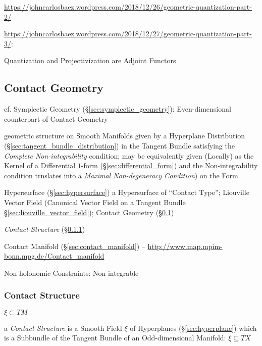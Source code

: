 \url{https://johncarlosbaez.wordpress.com/2018/12/26/geometric-quantization-part-2/}

\url{https://johncarlosbaez.wordpress.com/2018/12/27/geometric-quantization-part-3/}:

Quantization and Projectivization are Adjoint Functors



\subsection{Contact Geometry}\label{sec:contact_geometry}

\fist cf. Symplectic Geometry (\S\ref{sec:symplectic_geometry}):
Even-dimensional counterpart of Contact Geometry

geometric structure on Smooth Manifolds given by a Hyperplane Distribution
(\S\ref{sec:tangent_bundle_distribution}) in the Tangent Bundle satisfying the
\emph{Complete Non-integrability} condition; may be equivalently given
(Locally) as the Kernel of a Differential $1$-form
(\S\ref{sec:differential_form}) and the Non-integrability condition trnslates
into a \emph{Maximal Non-degeneracy Condition}) on the Form

Hypersurface (\S\ref{sec:hypersurface}) a Hypersurface of ``Contact Type'';
Liouville Vector Field (Canonical Vector Field on a Tangent Bundle
\S\ref{sec:liouville_vector_field}); \fist Contact Geometry
(\S\ref{sec:contact_geometry})

\emph{Contact Structure} (\S\ref{sec:contact_structure})

\fist Contact Manifold (\S\ref{sec:contact_manifold}) --
\url{http://www.map.mpim-bonn.mpg.de/Contact_manifold}

Non-holonomic Constraints: Non-integrable



\subsubsection{Contact Structure}\label{sec:contact_structure}

$\xi \subset TM$

a \emph{Contact Structure} is a Smooth Field $\xi$ of Hyperplanes
(\S\ref{sec:hyperplane}) which is a Subbundle of the Tangent Bundle of an
Odd-dimensional Manifold: $\xi \subseteq T X$

